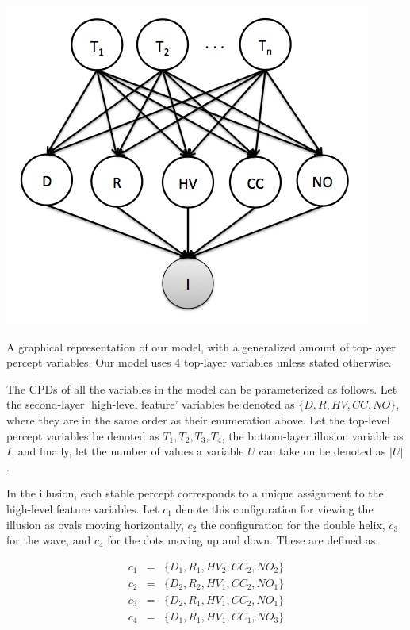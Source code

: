 \documentclass{article} %
\begin{document}
\begin{center}
\includegraphics[scale=0.51]{graphical_model}
\end{center}
\small
A graphical representation of our model, with a generalized amount of top-layer percept variables. Our model uses 4 top-layer variables unless stated otherwise.
\normalsize


The CPDs of all the variables in the model can be parameterized as follows. Let the second-layer 'high-level feature' variables be denoted as $\{D, R, HV, CC, NO\}$, where they are in the same order as their enumeration above. Let the top-level percept variables be denoted as $T_1, T_2, T_3, T_4$, the bottom-layer illusion variable as $I$, and finally, let the number of values a variable $U$ can take on be denoted as $|U|$.  

In the illusion, each stable percept corresponds to a unique assignment to the high-level feature variables. Let $c_1$ denote this configuration for viewing the illusion as ovals moving horizontally, $c_2$ the configuration for the double helix, $c_3$ for the wave, and $c_4$ for the dots moving up and down. These are defined as:

\begin{eqnarray*}
c_1 &=& \{D_1,R_1,HV_2,CC_2,NO_2 \} \\
c_2 &=& \{D_2,R_2,HV_1,CC_2,NO_1 \} \\
c_3 &=& \{D_2,R_1,HV_1,CC_2,NO_1 \} \\
c_4 &=& \{D_1,R_1,HV_1,CC_1,NO_3 \} 
\end{eqnarray*}
\end{document}
